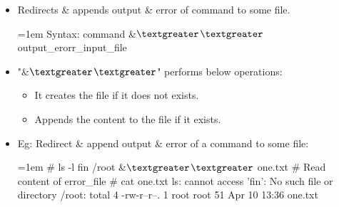 \setlength{\columnsep}{3pt}
\begin{flushleft}

	\begin{itemize}
	\item Redirects \& appends output \& error of command to some file.
	\bigskip
	\begin{tcolorbox}[breakable,notitle,boxrule=-0pt,colback=pink,colframe=pink]
		\color{black}
		\font=1em
		Syntax: command \&{$\textgreater$}{$\textgreater$} output\_erorr\_input\_file
		\font=4pt
	\end{tcolorbox}
	\item "\&{$\textgreater$}{$\textgreater$}" performs below operations:
	\begin{itemize}
		\item It creates the file if it does not exists.
		\item Appends the content to the file if it exists.
	\end{itemize}
	\item
	Eg: Redirect \& append output \& error of a command to some file:
	\bigskip
	\begin{tcolorbox}[breakable,notitle,boxrule=-0pt,colback=black,colframe=black]
		\color{green}
		\font=1em
		\# ls -l fin /root \&{$\textgreater$}{$\textgreater$} one.txt
		\newline
		\newline
		\color{yellow}
		\# Read content of error\_file
		\color{green}
		\newline
		\# cat one.txt
		\newline
		\color{white}
		ls: cannot access 'fin': No such file or directory
		\newline
		/root:
		\color{white}
		\newline
		total 4
		\color{white}
		\newline
		\color{white} -rw-r--r--. 1 root root 51 Apr 10 13:36 one.txt
		\font=4pt
	\end{tcolorbox}

\end{itemize}
	

	
\end{flushleft}



\newpage